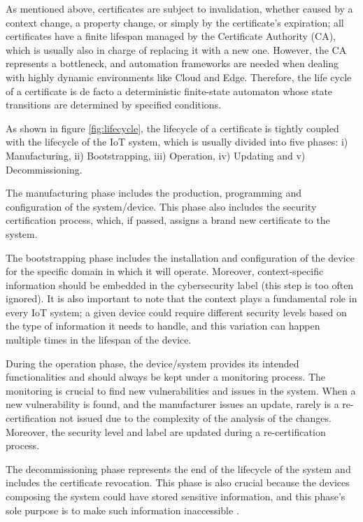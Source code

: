 As mentioned above, certificates are subject to invalidation, whether caused by a context change, a property change, or simply by the certificate's expiration; all certificates have a finite lifespan managed by the Certificate Authority (CA), which is usually also in charge of replacing it with a new one. However, the CA represents a bottleneck, and automation frameworks are needed when dealing with highly dynamic environments like Cloud and Edge. Therefore, the life cycle of a certificate is de facto a deterministic finite-state automaton whose state transitions are determined by specified conditions.

As shown in figure \ref{fig:lifecycle}, the lifecycle of a certificate is tightly coupled with the lifecycle of the IoT system, which is usually divided into five phases: i) Manufacturing, ii) Bootstrapping, iii) Operation, iv) Updating and v) Decommissioning.

The manufacturing phase includes the production, programming and configuration of the system/device. This phase also includes the security certification process, which, if passed, assigns a brand new certificate to the system.

The bootstrapping phase includes the installation and configuration of the device for the specific domain in which it will operate. Moreover, context-specific information should be embedded in the cybersecurity label (this step is too often ignored). It is also important to note that the context plays a fundamental role in every IoT system; a given device could require different security levels based on the type of information it needs to handle, and this variation can happen multiple times in the lifespan of the device.

During the operation phase, the device/system provides its intended functionalities and should always be kept under a monitoring process. The monitoring is crucial to find new vulnerabilities and issues in the system. When a new vulnerability is found, and the manufacturer issues an update, rarely is a re-certification not issued due to the complexity of the analysis of the changes. Moreover, the security level and label are updated during a re-certification process.

The decommissioning phase represents the end of the lifecycle of the system and includes the certificate revocation. This phase is also crucial because the devices composing the system could have stored sensitive information, and this phase's sole purpose is to make such information inaccessible \cite{surveyIOT}.

